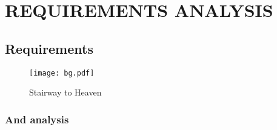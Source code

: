 
\chapter{REQUIREMENTS ANALYSIS} %

\section{Requirements}
\lipsum[1-3]
\begin{figure}[htb!]
  \centering
  \texttt{[image: bg.pdf]}
  \caption{Stairway to Heaven}
  \label{StH}	
\end{figure}
\lipsum[1-3]
\subsection{And analysis}
\lipsum[4-6]

